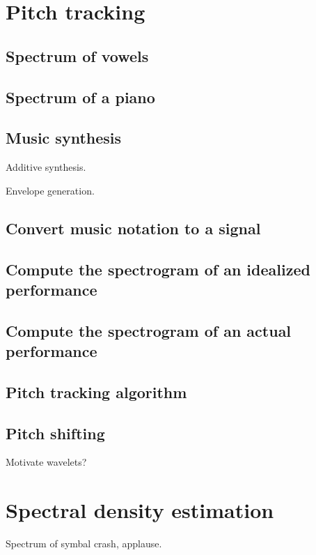 \documentclass[12pt]{book}
\begin{document}
\chapter{Pitch tracking}

\section{Spectrum of vowels}

\section{Spectrum of a piano}

\section{Music synthesis}

Additive synthesis.

Envelope generation.

\section{Convert music notation to a signal}

\section{Compute the spectrogram of an idealized performance}

\section{Compute the spectrogram of an actual performance}

\section{Pitch tracking algorithm}

\section{Pitch shifting}

Motivate wavelets?


\chapter{Spectral density estimation}

Spectrum of symbal crash, applause.
\end{document}
